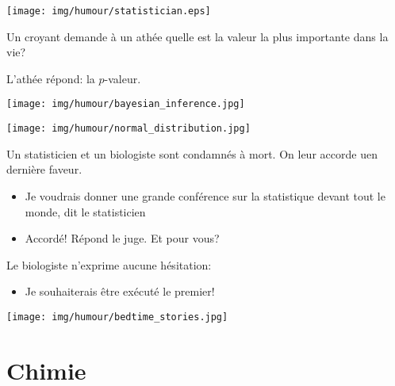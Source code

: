 	\begin{center}\underline{\hspace{5 cm}}\end{center}
	\begin{center}
	\texttt{[image: img/humour/statistician.eps]}
	\end{center}	
	\begin{center}\underline{\hspace{5 cm}}\end{center}		
	
	Un croyant demande à un athée quelle est la valeur la plus importante dans la vie?
	
	L'athée répond: la $p$-valeur.
	\begin{center}
	\texttt{[image: img/humour/bayesian\_inference.jpg]}
	\end{center}
	
	\begin{center}\underline{\hspace{5 cm}}\end{center}
	\begin{center}
	\texttt{[image: img/humour/normal\_distribution.jpg]}
	\end{center}
	
	\pagebreak
	Un statisticien et un biologiste sont condamnés à mort. On leur accorde uen dernière faveur.
	\begin{itemize}
		\item Je voudrais donner une grande conférence sur la statistique devant tout le monde, dit le statisticien
		\item Accordé! Répond le juge. Et pour vous?
	\end{itemize}
	Le biologiste n'exprime aucune hésitation:
	\begin{itemize}
		\item Je souhaiterais être exécuté le premier!
	\end{itemize}
	\begin{center}\underline{\hspace{5 cm}}\end{center}
	\begin{center}
	\texttt{[image: img/humour/bedtime\_stories.jpg]}
	\end{center}
		
	\pagebreak
	\section{Chimie}

